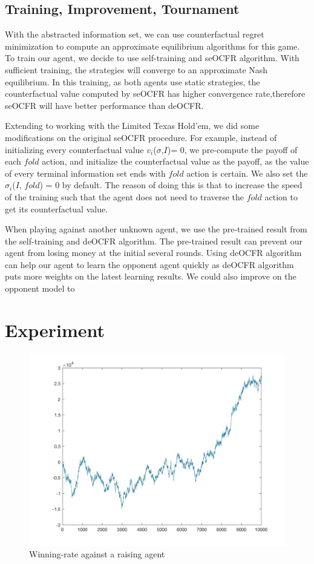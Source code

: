\documentclass{article}
\begin{document}
\subsection{Training, Improvement, Tournament}

With the abstracted information set, we can use counterfactual regret minimization to compute an approximate equilibrium algorithms for this game. To train our agent, we decide to use self-training and seOCFR algorithm. With sufficient training, the strategies will converge to an approximate Nash equilibrium. In this training, as both agents use static strategies, the counterfactual value computed by seOCFR has higher convergence rate,therefore seOCFR will have better performance than deOCFR.

Extending to working with the Limited Texas Hold’em, we did some modifications on the original seOCFR procedure. For example, instead of initializing every counterfactual value $v_i$($\sigma$,$I$)= 0, we pre-compute the payoff of each $fold$ action, and initialize the counterfactual value as the payoff, as the value of every terminal information set ends with $fold$ action is certain. We also set the $\sigma_i$($I$, $fold$) = 0 by default. The reason of doing this is that to increase the speed of the training such that the agent does not need to traverse the $fold$ action to get its counterfactual value.

When playing against another unknown agent, we use the pre-trained result from the self-training and deOCFR algorithm. The pre-trained result can prevent our agent from losing money at the initial several rounds. Using deOCFR algorithm can help our agent to learn the opponent agent quickly as deOCFR algorithm puts more weights on the latest learning results. We could also improve on the opponent model to 

\section{Experiment}


\begin{figure}[hbt!]
\centering
\includegraphics[scale=0.1]{win.jpg}
\caption{\label{fig:win}Winning-rate against a raising agent}
\end{figure}
\end{document}
